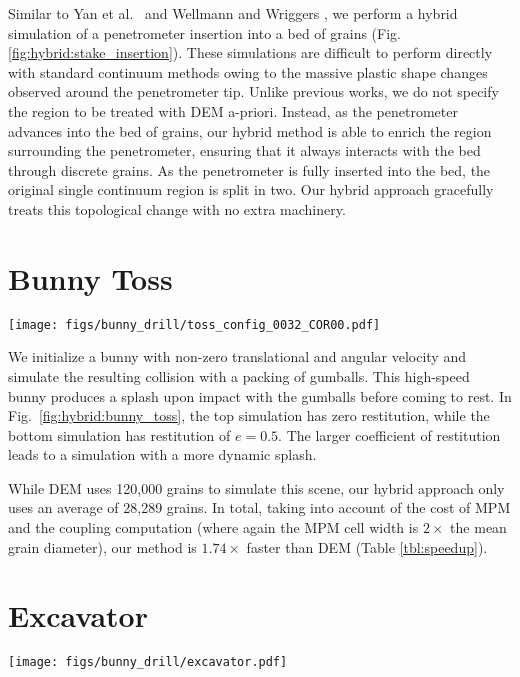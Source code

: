 
Similar to Yan et al.~\cite{Yan:2010} and Wellmann and Wriggers \cite{Wellmann:2012}, we perform a hybrid
simulation of a penetrometer insertion into a bed of grains (Fig. \ref{fig:hybrid:stake_insertion}). These simulations
are difficult to perform directly with standard continuum methods owing to the massive plastic shape changes observed
around the penetrometer tip. Unlike previous works, we do not specify the region to be treated with DEM
a-priori. Instead, as the penetrometer advances into the bed of grains, our hybrid method is able to
enrich the region surrounding the penetrometer, ensuring that it always interacts with the bed through discrete grains.
As the penetrometer is fully inserted into the bed, the original single continuum region is split in two. Our hybrid
approach gracefully treats this topological change with no extra machinery.

\section{Bunny Toss}
\begin{center}
  \centering
  \texttt{[image: figs/bunny\_drill/toss\_config\_0032\_COR00.pdf]}
  \label{fig:hybrid:bunny_toss}
\end{center}
We initialize a bunny with non-zero translational and angular velocity and simulate the resulting collision 
with a packing of gumballs. This high-speed bunny produces a splash upon impact with the gumballs before coming to rest.
In Fig.~\ref{fig:hybrid:bunny_toss}, the top simulation has zero restitution, while the bottom simulation has restitution of $e = 0.5$.
The larger coefficient of restitution leads to a simulation with a more dynamic splash.

While DEM uses 120,000 grains to simulate this scene, our hybrid approach only uses an average of 28,289 grains. In total, taking into account of the cost of MPM and the coupling computation (where again the MPM cell width is $2\times$ the mean grain diameter), our method is $1.74\times$ faster than DEM (Table \ref{tbl:speedup}).

\section{Excavator}
\begin{center}
\centering
  \texttt{[image: figs/bunny\_drill/excavator.pdf]}
  \label{fig:hybrid:excavator}
\end{center}

